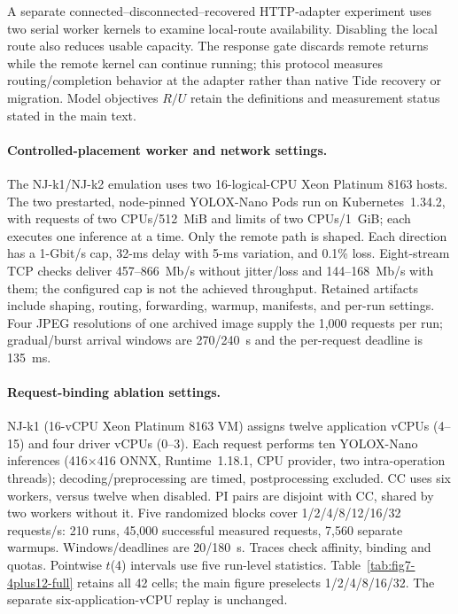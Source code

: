 A separate connected--disconnected--recovered HTTP-adapter experiment uses two serial worker kernels to examine local-route availability. Disabling the local route also reduces usable capacity. The response gate discards remote returns while the remote kernel can continue running; this protocol measures routing/completion behavior at the adapter rather than native Tide recovery or migration. Model objectives $R/U$ retain the definitions and measurement status stated in the main text.


\paragraph{Controlled-placement worker and network settings.}
The NJ-k1/NJ-k2 emulation uses two 16-logical-CPU Xeon Platinum 8163 hosts. The two prestarted, node-pinned YOLOX-Nano Pods run on Kubernetes~1.34.2, with requests of two CPUs/512~MiB and limits of two CPUs/1~GiB; each executes one inference at a time. Only the remote path is shaped. Each direction has a 1-Gbit/s cap, 32-ms delay with 5-ms variation, and 0.1\% loss. Eight-stream TCP checks deliver 457--866~Mb/s without jitter/loss and 144--168~Mb/s with them; the configured cap is not the achieved throughput. Retained artifacts include shaping, routing, forwarding, warmup, manifests, and per-run settings. Four JPEG resolutions of one archived image supply the 1,000 requests per run; gradual/burst arrival windows are 270/240~s and the per-request deadline is 135~ms.

\paragraph{Request-binding ablation settings.}
NJ-k1 (16-vCPU Xeon Platinum 8163 VM) assigns twelve application vCPUs (4--15) and four driver vCPUs (0--3). Each request performs ten YOLOX-Nano inferences (416$\times$416 ONNX, Runtime~1.18.1, CPU provider, two intra-operation threads); decoding/preprocessing are timed, postprocessing excluded. CC uses six workers, versus twelve when disabled. PI pairs are disjoint with CC, shared by two workers without it. Five randomized blocks cover 1/2/4/8/12/16/32 requests/s: 210 runs, 45,000 successful measured requests, 7,560 separate warmups. Windows/deadlines are 20/180~s. Traces check affinity, binding and quotas. Pointwise $t$(4) intervals use five run-level statistics. Table~\ref{tab:fig7-4plus12-full} retains all 42 cells; the main figure preselects 1/2/4/8/16/32. The separate six-application-vCPU replay is unchanged.

